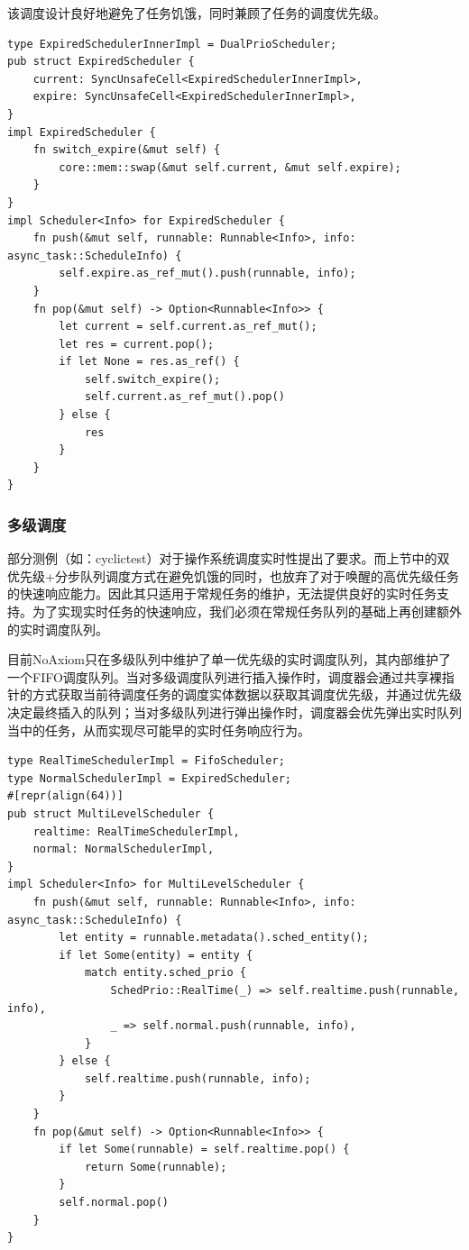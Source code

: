 \documentclass{article}
\begin{document}
该调度设计良好地避免了任务饥饿，同时兼顾了任务的调度优先级。

\begin{lstlisting}
type ExpiredSchedulerInnerImpl = DualPrioScheduler;
pub struct ExpiredScheduler {
    current: SyncUnsafeCell<ExpiredSchedulerInnerImpl>,
    expire: SyncUnsafeCell<ExpiredSchedulerInnerImpl>,
}
impl ExpiredScheduler {
    fn switch_expire(&mut self) {
        core::mem::swap(&mut self.current, &mut self.expire);
    }
}
impl Scheduler<Info> for ExpiredScheduler {
    fn push(&mut self, runnable: Runnable<Info>, info: async_task::ScheduleInfo) {
        self.expire.as_ref_mut().push(runnable, info);
    }
    fn pop(&mut self) -> Option<Runnable<Info>> {
        let current = self.current.as_ref_mut();
        let res = current.pop();
        if let None = res.as_ref() {
            self.switch_expire();
            self.current.as_ref_mut().pop()
        } else {
            res
        }
    }
}
\end{lstlisting}

\subsubsection{多级调度}

部分测例（如：cyclictest）对于操作系统调度实时性提出了要求。而上节中的双优先级+分步队列调度方式在避免饥饿的同时，也放弃了对于唤醒的高优先级任务的快速响应能力。因此其只适用于常规任务的维护，无法提供良好的实时任务支持。为了实现实时任务的快速响应，我们必须在常规任务队列的基础上再创建额外的实时调度队列。

目前NoAxiom只在多级队列中维护了单一优先级的实时调度队列，其内部维护了一个FIFO调度队列。当对多级调度队列进行插入操作时，调度器会通过共享裸指针的方式获取当前待调度任务的调度实体数据以获取其调度优先级，并通过优先级决定最终插入的队列；当对多级队列进行弹出操作时，调度器会优先弹出实时队列当中的任务，从而实现尽可能早的实时任务响应行为。


\begin{lstlisting}
type RealTimeSchedulerImpl = FifoScheduler;
type NormalSchedulerImpl = ExpiredScheduler;
#[repr(align(64))]
pub struct MultiLevelScheduler {
    realtime: RealTimeSchedulerImpl,
    normal: NormalSchedulerImpl,
}
impl Scheduler<Info> for MultiLevelScheduler {
    fn push(&mut self, runnable: Runnable<Info>, info: async_task::ScheduleInfo) {
        let entity = runnable.metadata().sched_entity();
        if let Some(entity) = entity {
            match entity.sched_prio {
                SchedPrio::RealTime(_) => self.realtime.push(runnable, info),
                _ => self.normal.push(runnable, info),
            }
        } else {
            self.realtime.push(runnable, info);
        }
    }
    fn pop(&mut self) -> Option<Runnable<Info>> {
        if let Some(runnable) = self.realtime.pop() {
            return Some(runnable);
        }
        self.normal.pop()
    }
}
\end{lstlisting}
\end{document}
